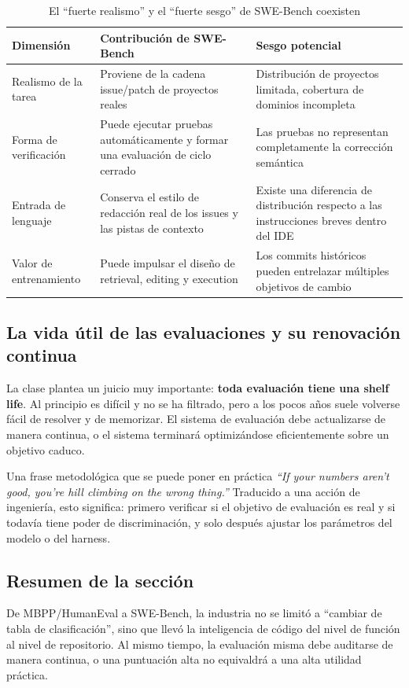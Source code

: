 \begin{table}[H]
\centering
\begin{tabular}{p{3.4cm}p{5.0cm}p{5.0cm}}
\toprule
\textbf{Dimensión} & \textbf{Contribución de SWE-Bench} & \textbf{Sesgo potencial} \\
\midrule
Realismo de la tarea & Proviene de la cadena issue/patch de proyectos reales & Distribución de proyectos limitada, cobertura de dominios incompleta \\
Forma de verificación & Puede ejecutar pruebas automáticamente y formar una evaluación de ciclo cerrado & Las pruebas no representan completamente la corrección semántica \\
Entrada de lenguaje & Conserva el estilo de redacción real de los issues y las pistas de contexto & Existe una diferencia de distribución respecto a las instrucciones breves dentro del IDE \\
Valor de entrenamiento & Puede impulsar el diseño de retrieval, editing y execution & Los commits históricos pueden entrelazar múltiples objetivos de cambio \\
\bottomrule
\end{tabular}
\caption{El ``fuerte realismo'' y el ``fuerte sesgo'' de SWE-Bench coexisten}
\end{table}

\subsection{La vida útil de las evaluaciones y su renovación continua}
La clase plantea un juicio muy importante: \textbf{toda evaluación tiene una shelf life}. Al principio es difícil y no se ha filtrado, pero a los pocos años suele volverse fácil de resolver y de memorizar. El sistema de evaluación debe actualizarse de manera continua, o el sistema terminará optimizándose eficientemente sobre un objetivo caduco.

\begin{importantbox}{Una frase metodológica que se puede poner en práctica}
\textit{``If your numbers aren't good, you're hill climbing on the wrong thing.''}  
Traducido a una acción de ingeniería, esto significa: primero verificar si el objetivo de evaluación es real y si todavía tiene poder de discriminación, y solo después ajustar los parámetros del modelo o del harness.
\end{importantbox}

\subsection{Resumen de la sección}
De MBPP/HumanEval a SWE-Bench, la industria no se limitó a ``cambiar de tabla de clasificación'', sino que llevó la inteligencia de código del nivel de función al nivel de repositorio. Al mismo tiempo, la evaluación misma debe auditarse de manera continua, o una puntuación alta no equivaldrá a una alta utilidad práctica.

